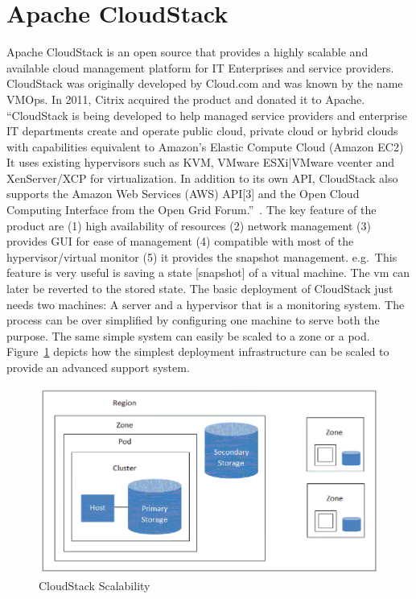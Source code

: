 
\section{Apache CloudStack}

Apache CloudStack is an open source that provides a highly scalable
and available cloud management platform for IT Enterprises and service
providers. CloudStack was originally developed by Cloud.com and was
known by the name VMOps.  In 2011, Citrix acquired the product and
donated it to Apache.
``CloudStack is being developed to help managed service providers and
enterprise IT departments create and operate public cloud, private
cloud or hybrid clouds with capabilities equivalent to Amazon's
Elastic Compute Cloud (Amazon EC2) It uses existing hypervisors such
as KVM, VMware ESXi|VMware vcenter and XenServer/XCP for
virtualization. In addition to its own API, CloudStack also supports
the Amazon Web Services (AWS) API[3] and the Open Cloud Computing
Interface from the Open Grid Forum.''~\cite{hid-sp18-417-wiki-cloudStack}.
The key feature of the product are 
 (1) high availability of resources
 (2) network management
 (3) provides GUI for ease of management
 (4) compatible with most of the hypervisor/virtual monitor
 (5) it provides the snapshot management. e.g.\ This feature is 
very useful is saving a state [snapshot] of a vitual machine. 
The vm can later be reverted to the stored state.  
The basic deployment of CloudStack just needs two machines: 
 A server and a hypervisor that is a monitoring system.  The process
can be over simplified by configuring one machine to serve both the
purpose.
The same simple system can easily be scaled to a zone or a pod.
Figure~\ref{F:cloudstack-scalabuility} depicts how the simplest
deployment infrastructure can be scaled to provide an advanced support
system.

\begin{figure}[htb]
\includegraphics[width=\textwidth]{images/hid-sp18-417-cloudstack.png}
\caption{CloudStack Scalability~\cite{hid-sp18-417-cloudstack-scaling}}
\label{F:cloudstack-scalabuility}
\end{figure}
